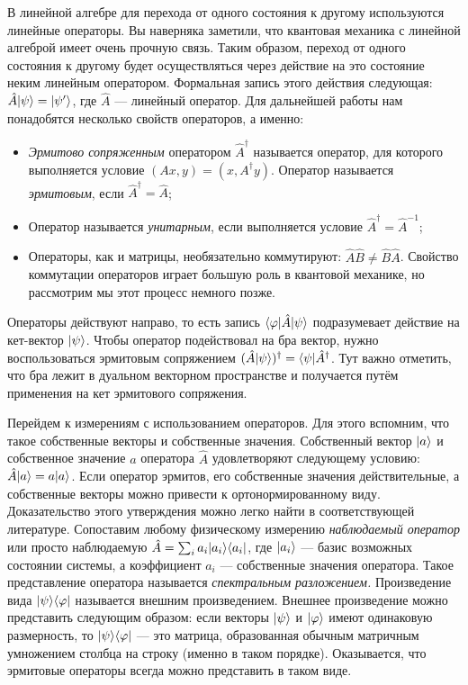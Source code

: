 В линейной алгебре для перехода от одного состояния к другому используются
линейные операторы. Вы наверняка заметили, что квантовая механика с линейной
алгеброй имеет очень прочную связь. Таким образом, переход от одного состояния
к другому будет осуществляться через действие на это состояние неким линейным
оператором. Формальная запись этого действия следующая: $\hat{A} \lvert\psi\rangle =
  \lvert\psi'\rangle$, где $\hat{A}$ --- линейный оператор. Для дальнейшей работы нам
понадобятся несколько свойств операторов, а именно:
\begin{itemize}
  \item \textit{Эрмитово сопряженным} оператором $\hat{A}^{\dagger}$ называется
        оператор, для которого выполняется условие $(Ax, y) = (x, A^{\dagger}y)$.
        Оператор называется \textit{эрмитовым}, если $\hat{A}^{\dagger} = \hat{A}$;
  \item Оператор называется \textit{унитарным}, если выполняется условие
        $\hat{A}^{\dagger} = \hat{A}^{-1}$;
  \item Операторы, как и матрицы, необязательно коммутируют: $\hat{A}\hat{B} \neq
          \hat{B}\hat{A}$. Свойство коммутации операторов играет большую роль в квантовой
        механике, но рассмотрим мы этот процесс немного позже.
\end{itemize}
Операторы действуют направо, то есть запись $\langle\varphi\rvert\hat{A}\lvert\psi\rangle$
подразумевает действие на кет-вектор $\lvert\psi\rangle$. Чтобы оператор подействовал
на бра вектор, нужно воспользоваться эрмитовым сопряжением
$(\hat{A}\lvert\psi\rangle)^{\dagger} = \langle\psi\rvert\hat{A}^{\dagger}$. Тут важно
отметить, что бра лежит в дуальном векторном пространстве и получается путём
применения на кет эрмитового сопряжения.

Перейдем к измерениям с использованием операторов. Для этого вспомним, что
такое собственные векторы и собственные значения. Собственный вектор $\lvert a\rangle$
и собственное значение $a$ оператора $\hat{A}$ удовлетворяют следующему
условию: $\hat{A}\lvert a\rangle = a\lvert a\rangle$. Если оператор эрмитов, его собственные
значения действительные, а собственные векторы можно привести к
ортонормированному виду. Доказательство этого утверждения можно легко найти в
соответствующей литературе. Сопоставим любому физическому измерению
\textit{наблюдаемый оператор} или просто наблюдаемую $\hat{A} = \sum_i a_i
  \lvert a_i\rangle\langle a_i\rvert$, где $\lvert a_i\rangle$ --- базис возможных состоянии системы, а
коэффициент $a_i$ --- собственные значения оператора. Такое представление
оператора называется \textit{спектральным разложением.} Произведение вида
$\lvert\psi\rangle\langle\varphi\rvert$ называется внешним произведением. Внешнее
произведение можно представить следующим образом: если векторы $\lvert\psi\rangle$ и
$\lvert\varphi\rangle$ имеют одинаковую размерность, то $\lvert\psi\rangle\langle\varphi\rvert$ ---
это матрица, образованная обычным матричным умножением столбца на строку
(именно в таком порядке). Оказывается, что эрмитовые операторы всегда можно
представить в таком виде.

